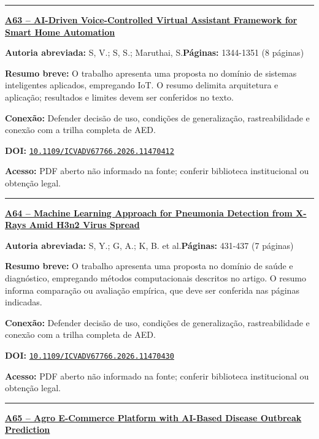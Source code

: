 \documentclass[10pt,a4paper]{article}
\begin{document}
\noindent\rule{\textwidth}{0.35pt}
\par\medskip\noindent
{\large\bfseries\href{https://doi.org/10.1109/ICVADV67766.2026.11470412}{A63 -- AI-Driven Voice-Controlled Virtual Assistant Framework for Smart Home Automation}}\par\smallskip
\textbf{Autoria abreviada:} S, V.; S, S.; Maruthai, S.\quad \textbf{Páginas:} 1344-1351 (8 páginas)\par
\textbf{Resumo breve:} O trabalho apresenta uma proposta no domínio de sistemas inteligentes aplicados, empregando IoT. O resumo delimita arquitetura e aplicação; resultados e limites devem ser conferidos no texto.\par
\textbf{Conexão:} Defender decisão de uso, condições de generalização, rastreabilidade e conexão com a trilha completa de AED.\par
\textbf{DOI:} \href{https://doi.org/10.1109/ICVADV67766.2026.11470412}{\nolinkurl{10.1109/ICVADV67766.2026.11470412}}\par
\textbf{Acesso:} PDF aberto não informado na fonte; conferir biblioteca institucional ou obtenção legal.\par
\noindent\rule{\textwidth}{0.35pt}
\par\medskip\noindent
{\large\bfseries\href{https://doi.org/10.1109/ICVADV67766.2026.11470430}{A64 -- Machine Learning Approach for Pneumonia Detection from X-Rays Amid H3n2 Virus Spread}}\par\smallskip
\textbf{Autoria abreviada:} S, Y.; G, A.; K, B. et al.\quad \textbf{Páginas:} 431-437 (7 páginas)\par
\textbf{Resumo breve:} O trabalho apresenta uma proposta no domínio de saúde e diagnóstico, empregando métodos computacionais descritos no artigo. O resumo informa comparação ou avaliação empírica, que deve ser conferida nas páginas indicadas.\par
\textbf{Conexão:} Defender decisão de uso, condições de generalização, rastreabilidade e conexão com a trilha completa de AED.\par
\textbf{DOI:} \href{https://doi.org/10.1109/ICVADV67766.2026.11470430}{\nolinkurl{10.1109/ICVADV67766.2026.11470430}}\par
\textbf{Acesso:} PDF aberto não informado na fonte; conferir biblioteca institucional ou obtenção legal.\par
\noindent\rule{\textwidth}{0.35pt}
\par\medskip\noindent
{\large\bfseries\href{https://doi.org/10.1109/ICVADV67766.2026.11470335}{A65 -- Agro E-Commerce Platform with AI-Based Disease Outbreak Prediction}}\par\smallskip
\end{document}
